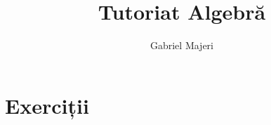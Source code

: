 \documentclass[a4paper, 12pt]{article}
\title{Tutoriat Algebră}
\author{Gabriel Majeri}
\date{}
\theoremstyle{definition}
\begin{document}
\maketitle

\section*{Exerciții}











\end{document}
